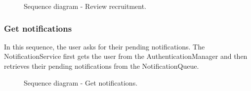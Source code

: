 \begin{figure}[H]
    \centering
    \caption{\label{fig:sequence-review-recruitment}Sequence diagram - Review recruitment.}
\end{figure}

\subsubsection{Get notifications}
In this sequence, the user asks for their pending notifications.
The NotificationService first gets the user from the AuthenticationManager and then retrieves their pending notifications from the NotificationQueue.

\begin{figure}[H]
    \centering
    \caption{\label{fig:sequence-get-notifications}Sequence diagram - Get notifications.}
\end{figure}

